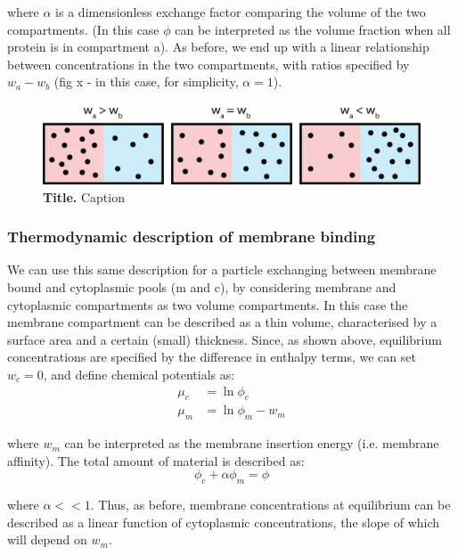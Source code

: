 \documentclass[12pt]{"article"}
\newcommand{\mycaption}[2]{\caption[#1]{\textbf{#1.} #2}}
\begin{document}
where $\alpha$ is a dimensionless exchange factor comparing the volume of the two compartments. (In this case $\phi$ can be interpreted as the volume fraction when all protein is in compartment a). As before, we end up with a linear relationship between concentrations in the two compartments, with ratios specified by $w_a - w_b$ (fig x - in this case, for simplicity, $\alpha = 1$).

\begin{figure}[!h]
\includegraphics[scale=0.9]{thermodynamic_simple_example}
\setlength{\abovecaptionskip}{20pt}
\centering
\mycaption{Title}{Caption}
\end{figure}

\subsubsection{Thermodynamic description of membrane binding}

We can use this same description for a particle exchanging between membrane bound and cytoplasmic pools (m and c), by considering membrane and cytoplasmic compartments as two volume compartments. In this case the membrane compartment can be described as a thin volume, characterised by a surface area and a certain (small) thickness. Since, as shown above, equilibrium concentrations are specified by the difference in enthalpy terms, we can set $w_c = 0$, and define chemical potentials as:
\begin{align}
\mu_c &= \ln\phi_c\\
\mu_m &= \ln\phi_m - w_m
\end{align} 

where $w_m$ can be interpreted as the membrane insertion energy (i.e. membrane affinity). The total amount of material is described as:
\begin{equation}
\phi_c + \alpha\phi_m = \phi
\end{equation}

where $\alpha << 1$. Thus, as before, membrane concentrations at equilibrium can be described as a linear function of cytoplasmic concentrations, the slope of which will depend on $w_m$.\\
\end{document}
